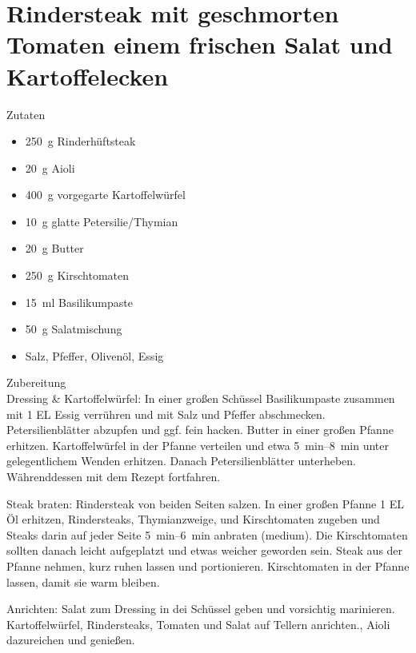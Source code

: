 \section*{Rindersteak mit geschmorten Tomaten einem frischen Salat und Kartoffelecken}
\ihead{}\ohead{}
\cfoot{}
{\Large Zutaten}
\begin{multicols}{2}
\begin{itemize}
    \item \SI{250}{g} Rinderhüftsteak
    \item \SI{20}{g} Aioli
    \item \SI{400}{g} vorgegarte Kartoffelwürfel
    \item \SI{10}{g} glatte Petersilie/Thymian
    \item \SI{20}{g} Butter
    \item \SI{250}{g} Kirschtomaten
    \item \SI{15}{ml} Basilikumpaste
    \item \SI{50}{g} Salatmischung
    \item Salz, Pfeffer, Olivenöl, Essig
\end{itemize}
\end{multicols}
\noindent
{\Large Zubereitung}\\
Dressing \& Kartoffelwürfel: In einer großen Schüssel Basilikumpaste zusammen mit \num{1} EL Essig verrühren und mit Salz und Pfeffer abschmecken.
Petersilienblätter abzupfen und ggf. fein hacken.
Butter in einer großen Pfanne erhitzen.
Kartoffelwürfel in der Pfanne verteilen und etwa \SIrange{5}{8}{min} unter gelegentlichem Wenden erhitzen. 
Danach Petersilienblätter unterheben.
Währenddessen mit dem Rezept fortfahren. 

Steak braten: Rindersteak von beiden Seiten salzen.
In einer großen Pfanne \num{1} EL Öl erhitzen, Rindersteaks, Thymianzweige, und Kirschtomaten zugeben und Steaks darin auf jeder Seite \SIrange{5}{6}{min} anbraten (medium). 
Die Kirschtomaten sollten danach leicht aufgeplatzt und etwas weicher geworden sein.
Steak aus der Pfanne nehmen, kurz ruhen lassen und portionieren.
Kirschtomaten in der Pfanne lassen, damit sie warm bleiben. 

Anrichten: Salat zum Dressing in dei Schüssel geben und vorsichtig marinieren. 
Kartoffelwürfel, Rindersteaks, Tomaten und Salat auf Tellern anrichten., Aioli dazureichen und genießen. 